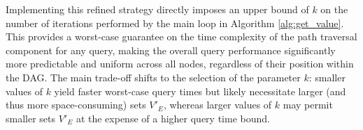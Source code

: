 Implementing this refined strategy directly imposes an upper bound of $k$ on the number of iterations performed by the main loop in Algorithm \ref{alg:get_value}. This provides a worst-case guarantee on the time complexity of the path traversal component for any \Rank{} query, making the overall query performance significantly more predictable and uniform across all nodes, regardless of their position within the DAG. The main trade-off shifts to the selection of the parameter $k$: smaller values of $k$ yield faster worst-case query times but likely necessitate larger (and thus more space-consuming) sets $V'_E$, whereas larger values of $k$ may permit smaller sets $V'_E$ at the expense of a higher query time bound.
